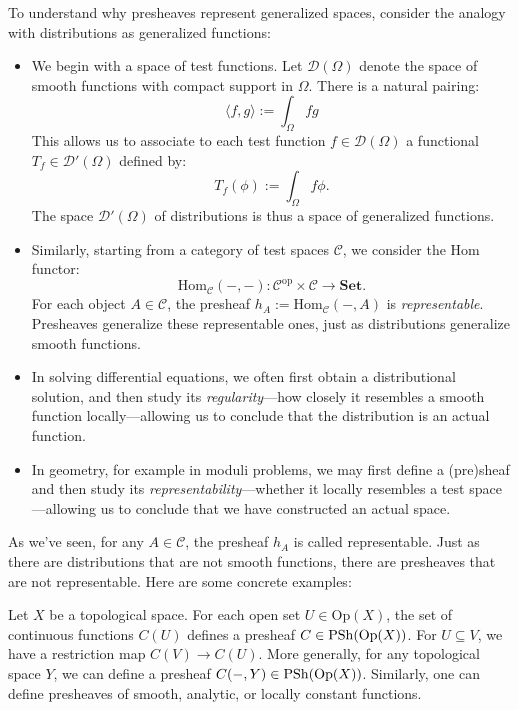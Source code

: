 \begin{remark}
To understand why presheaves represent generalized spaces, consider the analogy with distributions as generalized functions:
\begin{itemize}
    \item We begin with a space of test functions. Let $\mathcal{D}(\Omega)$ denote the space of smooth functions with compact support in $\Omega$. There is a natural pairing:
    \[
    \langle f, g \rangle := \int_\Omega f g
    \]
    This allows us to associate to each test function $f \in \mathcal{D}(\Omega)$ a functional $T_f \in \mathcal{D}'(\Omega)$ defined by:
    \[
    T_f(\phi) := \int_\Omega f \phi.
    \]
    The space $\mathcal{D}'(\Omega)$ of distributions is thus a space of generalized functions.

    \item Similarly, starting from a category of test spaces $\mathcal{C}$, we consider the Hom functor:
    \[
    \mathrm{Hom}_{\mathcal{C}}(-, -): \mathcal{C}^{\mathrm{op}} \times \mathcal{C} \to \mathbf{Set}.
    \]
    For each object $A \in \mathcal{C}$, the presheaf $h_A := \mathrm{Hom}_{\mathcal{C}}(-, A)$ is \emph{representable}. Presheaves generalize these representable ones, just as distributions generalize smooth functions.

    \item In solving differential equations, we often first obtain a distributional solution, and then study its \emph{regularity}—how closely it resembles a smooth function locally—allowing us to conclude that the distribution is an actual function.

    \item In geometry, for example in moduli problems, we may first define a (pre)sheaf and then study its \emph{representability}—whether it locally resembles a test space—allowing us to conclude that we have constructed an actual space.
\end{itemize}
\end{remark}

As we've seen, for any $A \in \mathcal{C}$, the presheaf $h_A$ is called representable. Just as there are distributions that are not smooth functions, there are presheaves that are not representable. Here are some concrete examples:

\begin{example}
Let $X$ be a topological space. For each open set $U \in \mathrm{Op}(X)$, the set of continuous functions $C(U)$ defines a presheaf $C \in \mathrm{PSh}(\mathrm{Op}(X))$. For $U \subseteq V$, we have a restriction map $C(V) \to C(U)$. More generally, for any topological space $Y$, we can define a presheaf $C(-, Y) \in \mathrm{PSh}(\mathrm{Op}(X))$. Similarly, one can define presheaves of smooth, analytic, or locally constant functions.
\end{example}

